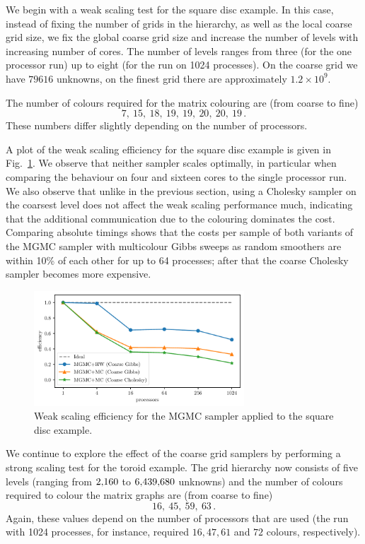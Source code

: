 \documentclass[
fontsize=11pt,
paper=a4,
numbers=noenddot
]{scrartcl}
\begin{document}
We begin with a weak scaling test for the square disc example. In this case, instead of fixing the number of grids in the hierarchy, as well as the local coarse grid size, we fix the global coarse grid size and increase the number of levels with increasing number of cores. The number of levels ranges from three (for the one processor run) up to eight (for the run on 1024 processes). On the coarse grid we have $79616$ unknowns, on the finest grid there are approximately $1.2 \times 10^9$.

The number of colours required for the matrix colouring are (from coarse to fine)
\begin{equation*}
  7,\ 15,\ 18,\ 19,\ 19,\ 20,\ 20,\ 19\,.
\end{equation*}
These numbers differ slightly depending on the number of processors.

A plot of the weak scaling efficiency for the square disc example is given in Fig.~\ref{fig:2d_unstructured_ws}. We observe that neither sampler scales optimally, in particular when comparing the behaviour on four and sixteen cores to the single processor run. We also observe that unlike in the previous section, using a Cholesky sampler on the coarsest level does not affect the weak scaling performance much, indicating that the additional communication due to the colouring dominates the cost. Comparing absolute timings shows that the costs per sample of both variants of the MGMC sampler with multicolour Gibbs sweeps as random smoothers are within 10\% of each other for up to 64 processes; after that the coarse Cholesky sampler becomes more expensive.

\begin{figure}[htbp]
    \centering
    \includegraphics[width=0.7\textwidth]{plots/ws_mgmc_fe.pdf}
    \caption{Weak scaling efficiency for the  MGMC sampler applied to the square disc example.}
    \label{fig:2d_unstructured_ws}
\end{figure}

We continue to explore the effect of the coarse grid samplers by performing a strong scaling test for the toroid example. The grid hierarchy now consists of five levels (ranging from $2{\small,}160$ to $6{\small,}439{\small,}680$ unknowns) and the number of colours required to colour the matrix graphs are (from coarse to fine)
\begin{equation*}
  16,\ 45,\ 59,\ 63\,.
\end{equation*}
Again, these values depend on the number of processors that are used (the run with 1024 processes, for instance, required $16,47,61$ and $72$ colours, respectively). 
\end{document}

